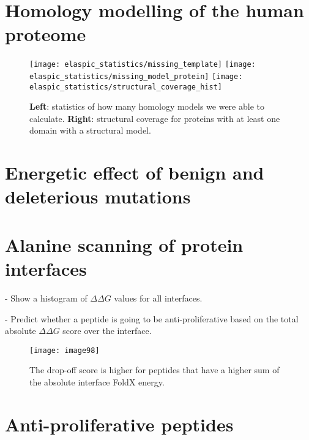 
\section{Homology modelling of the human proteome}

\begin{figure}[H]
	\centering
	\texttt{[image: elaspic\_statistics/missing\_template]}
	\texttt{[image: elaspic\_statistics/missing\_model\_protein]}
	\texttt{[image: elaspic\_statistics/structural\_coverage\_hist]}
	\caption{\textbf{Left}: statistics of how many homology models we were able to calculate. \textbf{Right}: structural coverage for proteins with at least one domain with a structural model.}
\end{figure}



\section{Energetic effect of benign and deleterious mutations}



\section{Alanine scanning of protein interfaces}

- Show a histogram of $\Delta \Delta G$ values for all interfaces.

- Predict whether a peptide is going to be anti-proliferative based on the total absolute $\Delta \Delta G$ score over the interface.


\begin{figure}[H]
	\centering
	\texttt{[image: image98]}
	\caption[pipeline]{The drop-off score is higher for peptides that have a higher sum of the absolute interface FoldX energy.}
\end{figure}


\section{Anti-proliferative peptides}




